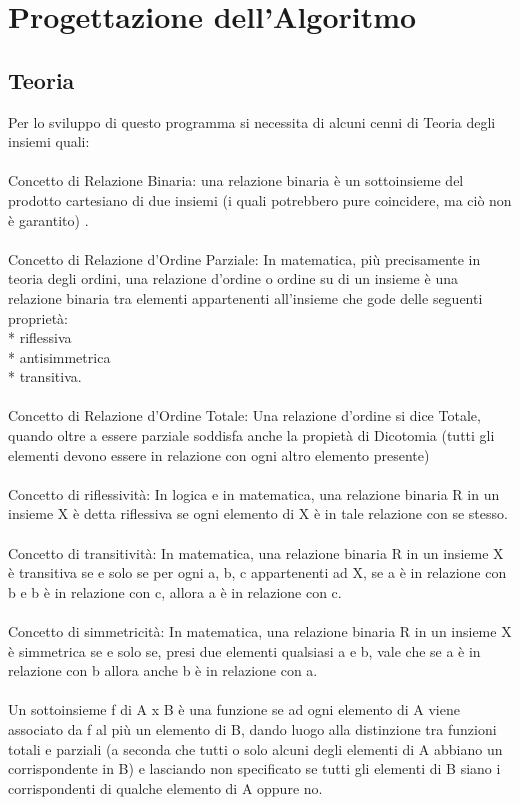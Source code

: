 \documentclass[11pt, a4paper, titlepage, block]{article}
\begin{document}
	
	
	\newpage   
\section{Progettazione dell'Algoritmo}
\subsection{Teoria}
Per lo sviluppo di questo programma si necessita di alcuni cenni di Teoria degli insiemi quali:\\
\\
Concetto di Relazione Binaria: una relazione binaria \`e un sottoinsieme del prodotto
cartesiano di due insiemi (i quali potrebbero pure coincidere,
ma ci\`o non \`e garantito) .\\
\\
Concetto di Relazione d'Ordine Parziale: In matematica, pi\`u precisamente in teoria degli ordini, una relazione d'ordine o ordine su di un insieme \`e una relazione binaria tra elementi appartenenti all'insieme che gode delle seguenti propriet\`a:\\
* riflessiva\\
* antisimmetrica\\
* transitiva.\\
\\
Concetto di Relazione d'Ordine Totale: Una relazione d'ordine si dice Totale, quando oltre a essere parziale soddisfa anche la propiet\`a di Dicotomia (tutti gli elementi devono essere in relazione con ogni altro elemento presente)\\
\\
Concetto di riflessivit\`a: In logica e in matematica, una relazione binaria R in un insieme X \`e detta riflessiva se ogni elemento di X \`e in tale relazione con se stesso. \\
\\
Concetto di transitivit\`a: In matematica, una relazione binaria R in un insieme X \`e transitiva se e solo se per ogni a, b, c appartenenti ad X, se a \`e in relazione con b e b \`e in relazione con c, allora a \`e in relazione con c. \\
\\
Concetto di simmetricit\`a: In matematica, una relazione binaria R in un insieme X \`e simmetrica se e solo se, presi due elementi qualsiasi a e b, vale che se a \`e in relazione con b allora anche b \`e in relazione con a.\\
\\
Un sottoinsieme f di A x B \`e una funzione se ad ogni
elemento di A viene associato da f al pi\`u un elemento di B,
dando luogo alla distinzione tra funzioni totali e parziali
 (a seconda che tutti o solo alcuni degli elementi di A
abbiano un corrispondente in B) e lasciando non specificato
se tutti gli elementi di B siano i corrispondenti di
qualche elemento di A oppure no.\\
\newpage
\end{document}
